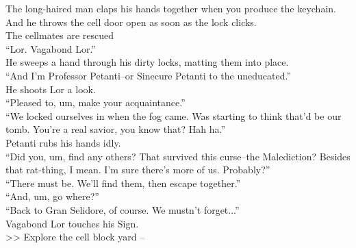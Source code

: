 The long-haired man claps his hands together when you produce the keychain. And he throws the cell door open as soon as the lock clicks.\\
 The cellmates are rescued\\

“Lor. Vagabond Lor.”\\
He sweeps a hand through his dirty locks, matting them into place.\\

“And I’m Professor Petanti--or Sinecure Petanti to the uneducated.”\\
He shoots Lor a look.\\

“Pleased to, um, make your acquaintance.”\\

“We locked ourselves in when the fog came. Was starting to think that’d be our tomb. You’re a real savior, you know that? Hah ha.”\\

Petanti rubs his hands idly.\\
“Did you, um, find any others? That survived this curse--the Malediction? Besides that rat-thing, I mean. I’m sure there’s more of us. Probably?”\\

“There must be. We’ll find them, then escape together.”\\

“And, um, go where?”\\

“Back to Gran Selidore, of course. We mustn’t forget...”\\

Vagabond Lor touches his Sign.\\

>> Explore the cell block yard -- 